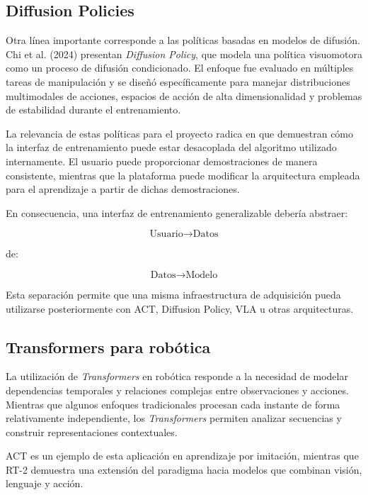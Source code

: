 \documentclass[stu,12pt,floatsintext]{apa7}
\begin{document}
\subsection{Diffusion Policies}

Otra línea importante corresponde a las políticas basadas en modelos de difusión. Chi et al. (2024) presentan \textit{Diffusion Policy}, que modela una política visuomotora como un proceso de difusión condicionado. El enfoque fue evaluado en múltiples tareas de manipulación y se diseñó específicamente para manejar distribuciones multimodales de acciones, espacios de acción de alta dimensionalidad y problemas de estabilidad durante el entrenamiento.

La relevancia de estas políticas para el proyecto radica en que demuestran cómo la interfaz de entrenamiento puede estar desacoplada del algoritmo utilizado internamente. El usuario puede proporcionar demostraciones de manera consistente, mientras que la plataforma puede modificar la arquitectura empleada para el aprendizaje a partir de dichas demostraciones.

En consecuencia, una interfaz de entrenamiento generalizable debería abstraer:

\begin{equation}
\text{Usuario} \rightarrow \text{Datos}
\end{equation}

de:

\begin{equation}
\text{Datos} \rightarrow \text{Modelo}
\end{equation}

Esta separación permite que una misma infraestructura de adquisición pueda utilizarse posteriormente con ACT, Diffusion Policy, VLA u otras arquitecturas.

\subsection{Transformers para robótica}

La utilización de \textit{Transformers} en robótica responde a la necesidad de modelar dependencias temporales y relaciones complejas entre observaciones y acciones. Mientras que algunos enfoques tradicionales procesan cada instante de forma relativamente independiente, los \textit{Transformers} permiten analizar secuencias y construir representaciones contextuales.

ACT es un ejemplo de esta aplicación en aprendizaje por imitación, mientras que RT-2 demuestra una extensión del paradigma hacia modelos que combinan visión, lenguaje y acción.
\end{document}
